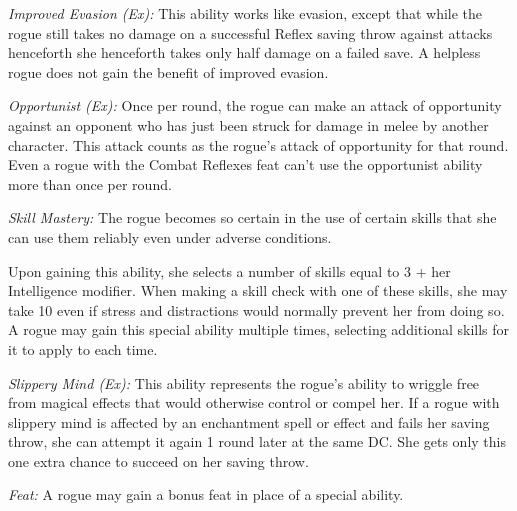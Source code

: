 \textit{Improved Evasion (Ex):} This ability works like evasion, except that while 
the rogue still takes no damage on a successful Reflex saving throw against attacks 
henceforth she henceforth takes only half damage on a failed save. A helpless rogue 
does not gain the benefit of improved evasion.

\textit{Opportunist (Ex):} Once per round, the rogue can make an attack of opportunity 
against an opponent who has just been struck for damage in melee by another character. 
This attack counts as the rogue's attack of opportunity for that round. Even a 
rogue with the Combat Reflexes feat can't use the opportunist ability more than 
once per round.

\textit{Skill Mastery:} The rogue becomes so certain in the use of certain skills 
that she can use them reliably even under adverse conditions.

Upon gaining this ability, she selects a number of skills equal to 3 + her Intelligence 
modifier. When making a skill check with one of these skills, she may take 10 even 
if stress and distractions would normally prevent her from doing so. A rogue may 
gain this special ability multiple times, selecting additional skills for it to 
apply to each time.

\textit{Slippery Mind (Ex):} This ability represents the rogue's ability to wriggle 
free from magical effects that would otherwise control or compel her. If a rogue 
with slippery mind is affected by an enchantment spell or effect and fails her 
saving throw, she can attempt it again 1 round later at the same DC. She gets only 
this one extra chance to succeed on her saving throw.

\textit{Feat:} A rogue may gain a bonus feat in place of a special ability.
